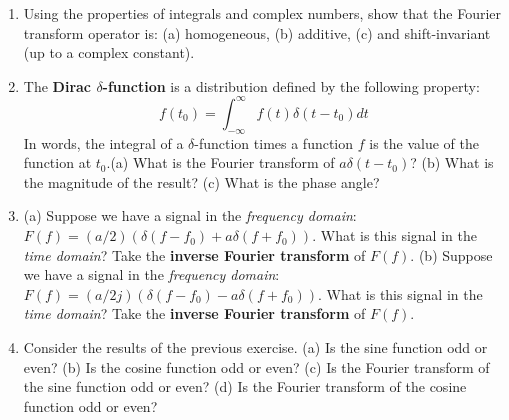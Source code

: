\documentclass{article}
\begin{document}
\begin{enumerate}
\item Using the properties of integrals and complex numbers, show that the Fourier transform operator is: (a) homogeneous, (b) additive, (c) and shift-invariant (up to a complex constant). \\ \vspace{2.5cm}
\item The \textbf{Dirac $\delta$-function} is a distribution defined by the following property:
\begin{equation}
f(t_0) = \int_{-\infty}^{\infty} f(t) \delta(t-t_0) dt
\end{equation}
In words, the integral of a $\delta$-function times a function $f$ is the value of the function at $t_0$.(a) What is the Fourier transform of $a\delta(t-t_0)$? (b) What is the magnitude of the result? (c) What is the phase angle? \\ \vspace{2.5cm}
\item (a) Suppose we have a signal in the \textit{frequency domain}: $F(f) = (a/2)(\delta(f-f_0) + a\delta(f+f_0))$.  What is this signal in the \textit{time domain}?  Take the \textbf{inverse Fourier transform} of $F(f)$. (b) Suppose we have a signal in the \textit{frequency domain}: $F(f) = (a/2j)(\delta(f-f_0) - a\delta(f+f_0))$.  What is this signal in the \textit{time domain}?  Take the \textbf{inverse Fourier transform} of $F(f)$. \\ \vspace{2.5cm}
\item Consider the results of the previous exercise.  (a) Is the sine function odd or even? (b) Is the cosine function odd or even? (c) Is the Fourier transform of the sine function odd or even? (d) Is the Fourier transform of the cosine function odd or even?
\end{enumerate}
\end{document}
